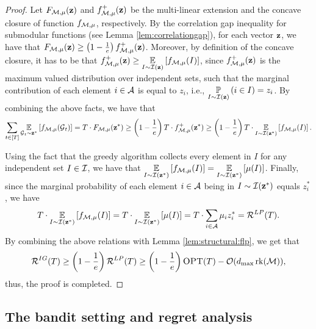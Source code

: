 \begin{proof}
Let $F_{\M,\mu}(\z)$ and $f_{\M,\mu}^+(\z)$ be the multi-linear extension and the concave closure of function $f_{\M,\mu}$, respectively. By the correlation gap inequality for submodular functions (see Lemma \ref{lem:correlationgap}), for each vector $\z$, we have that $F_{\M,\mu}(\z) \geq \left(1 - \frac{1}{e}\right)f_{\M,\mu}^+(\z)$. Moreover, by definition of the concave closure, it has to be that $f_{\M,\mu}^+(\z) \geq \Ex{I \sim \I(\z)}{f_{\M, \mu}(I)}$, since $f_{\M,\mu}^+(\z)$ is the maximum valued distribution over independent sets, such that the marginal contribution of each element $i \in \A$ is equal to $z_i$, i.e., $\Prob{I \sim \I(\z)}{i \in I} = z_i$. By combining the above facts, we have that
\begin{align*}
    \sum_{t \in [T]} \Ex{\G_t \sim \z^*}{f_{\M,\mu}(\G_t)} = T \cdot F_{\M,\mu}(\z^*) \geq \left(1 - \frac{1}{e}\right) T \cdot f^+_{\M,\mu}(\z^*) \geq \left(1 - \frac{1}{e}\right) T \cdot \Ex{I \sim \I(\z^*)}{f_{\M, \mu}(I)}.
\end{align*}

Using the fact that the greedy algorithm collects every element in $I$ for any independent set $I \in \I$, we have that $\Ex{I \sim \I(\z^*)}{f_{\M, \mu}(I)} = \Ex{I \sim \I(\z^*)}{\mu(I)}$. Finally, since the marginal probability of each element $i \in \A$ being in $I \sim \I(\z^*)$ equals $z^*_i$, we have
\begin{align*}
T \cdot \Ex{I \sim \I(\z^*)}{f_{\M, \mu}(I)} = T \cdot \Ex{I \sim \I(\z^*)}{\mu(I)} = T \cdot \sum_{i \in \A} \mu_i z^*_i = \Rew^{LP}(T).
\end{align*}
By combining the above relations with Lemma \ref{lem:structural:flp}, we get that
\begin{align*}
    \Rew^{IG}(T) \geq \left(1 - \frac{1}{e}\right) \Rew^{LP}(T) \geq \left(1 - \frac{1}{e}\right) \OPT(T) - \mathcal{O}(d_{\max} \rk(\M)),
\end{align*}
thus, the proof is completed.
\end{proof}





\subsection{The bandit setting and regret analysis}

